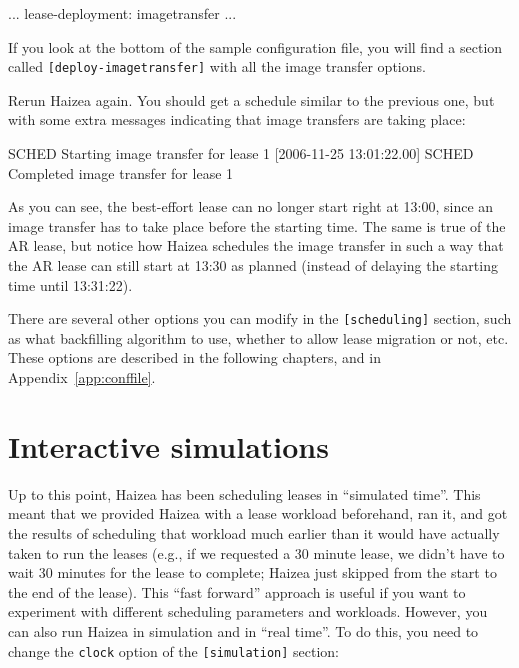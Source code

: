 \begin{wideshellverbatim}
[general]
...
lease-deployment: imagetransfer
...
\end{wideshellverbatim}

If you look at the bottom of the sample configuration file, you will find a section called \texttt{[deploy-imagetransfer]} with all the image transfer options.

Rerun Haizea again. You should get a schedule similar to the previous one, but with some extra messages indicating that image transfers are taking place:

\begin{wideshellverbatim}
[2006-11-25 13:00:00.00] SCHED   Starting image transfer for lease 1
[2006-11-25 13:01:22.00] SCHED   Completed image transfer for lease 1
\end{wideshellverbatim}

As you can see, the best-effort lease can no longer start right at 13:00, since an image transfer has to take place before the starting time. The same is true of the AR lease, but notice how Haizea schedules the image transfer in such a way that the AR lease can still start at 13:30 as planned (instead of delaying the starting time until 13:31:22).

There are several other options you can modify in the \texttt{[scheduling]} section, such as what backfilling algorithm to use, whether to allow lease migration or not, etc. These options are described in the following chapters, and in Appendix~\ref{app:conffile}.

\section{Interactive simulations} 

Up to this point, Haizea has been scheduling leases in ``simulated time''. This meant that we provided Haizea with a lease workload beforehand, ran it, and got the results of scheduling that workload much earlier than it would have actually taken to run the leases (e.g., if we requested a 30 minute lease, we didn't have to wait 30 minutes for the lease to complete; Haizea just skipped from the start to the end of the lease). This ``fast forward'' approach is useful if you want to experiment with different scheduling parameters and workloads. However, you can also run Haizea in simulation and in ``real time''. To do this, you need to change the \texttt{clock} option of the \texttt{[simulation]} section:

